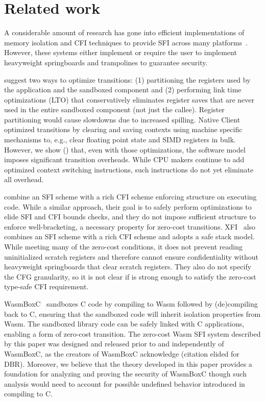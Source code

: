 \section{Related work}
\label{sec:related}

%
A considerable amount of research has gone into efficient implementations of
memory isolation and CFI techniques to provide SFI across many
platforms~\cite{sehr_adapting_2010,mccamant_evaluating_2006,
goonasekera_libvm_2015, lucet, omniware, omniware-pldi, vino, herder2009fault,
rockjit, robusta, vx32, gang-sfi, payer2011fine, wedge, lwc, shreds, bgi}.
%
However, these systems either implement or require the user to implement
heavyweight springboards and trampolines to guarantee security.

%
\citet{wahbe_efficient_1993} suggest two ways to optimize
transitions: (1) partitioning the registers used by the application and the
sandboxed component and (2) performing link time optimizations (LTO)
that conservatively eliminates register saves that are never used in the entire
sandboxed component (not just the callee).
%
Register partitioning would cause slowdowns due to increased spilling.
%
Native Client~\cite{yee_native_2009} optimized 
transitions by clearing and saving contexts using 
machine specific mechanisms to, e.g., clear floating point 
state and SIMD registers in bulk.
%
However, we show () that, even with those optimizations, the
software model imposes significant transition overheads.
%
While CPU makers continue to add optimized context switching
instructions, such instructions do not yet eliminate all
overhead.

\citet{zeng-tan2011} combine an SFI scheme with a rich CFI scheme
enforcing structure on executing code.
%
While a similar approach, their goal is to safely perform optimizations
to elide SFI and CFI bounds checks, and they do not impose sufficient structure to
enforce well-bracketing, a necessary property for zero-cost transitions.
%
XFI~\cite{xfi} also combines an SFI scheme with a rich CFI scheme and adopts a
safe stack model.
%
While meeting many of the zero-cost conditions, it does not prevent reading
uninitialized scratch registers and therefore cannot ensure confidentiality
without heavyweight springboards that clear scratch registers.
%
They also do not specify the CFG granularity, so it is not clear if is strong
enough to satisfy the zero-cost type-safe CFI requirement.

%
WasmBoxC~\cite{wasmboxc} sandboxes C code by compiling to Wasm
followed by (de)compiling back to C, ensuring that the sandboxed code will
inherit isolation properties from Wasm.
%
The sandboxed library code can be safely linked with C applications, enabling a
form of zero-cost transition.
%
The zero-cost Wasm SFI system described by this paper was designed and released
prior to and independently of WasmBoxC, as the creators of WasmBoxC acknowledge
(citation elided for DBR).
%
Moreover, we believe that the theory developed in this paper provides a foundation for
analyzing and proving the security of WasmBoxC though such analysis would need
to account for possible undefined behavior introduced in compiling to C.


